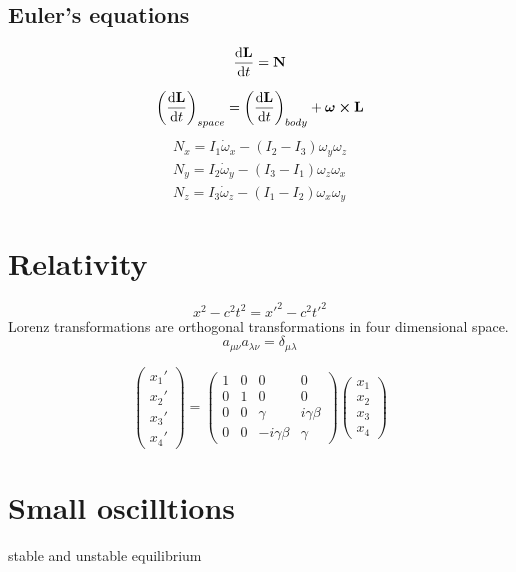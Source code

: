\documentclass[12pt]{article}
\begin{document}
\subsection*{Euler's equations}
\[\dv{\vb{L}}{t}=\vb{N}\]

\[\qty(\dv{\vb{L}}{t})_{space}=\qty(\dv{\vb{L}}{t})_{body}+\bm{\omega}\cp\vb{L}\]
\begin{align*}
N_x=I_1\dot{\omega}_x-(I_2-I_3){\omega}_y{\omega}_z\\
N_y=I_2\dot{\omega}_y-(I_3-I_1){\omega}_z{\omega}_x\\
N_z=I_3\dot{\omega}_z-(I_1-I_2){\omega}_x{\omega}_y
\end{align*}
\section*{Relativity}

\[x^2-c^2t^2=x'^2-c^2t'^2\]
Lorenz transformations are orthogonal transformations in four dimensional space.
\[a_{\mu\nu}a_{\lambda\nu}=\delta_{\mu\lambda}\]

\[
\begin{pmatrix}
x_1'\\ x_2'\\ x_3'\\ x_4'
\end{pmatrix}
=
\begin{pmatrix}
1& 0& 0& 0\\ 0& 1& 0& 0\\ 0& 0& \gamma& i\gamma\beta\\ 0& 0& -i\gamma\beta& \gamma
\end{pmatrix}
\begin{pmatrix}
x_1\\ x_2\\ x_3\\ x_4
\end{pmatrix}
\]

\section*{Small oscilltions}
stable and unstable equilibrium
\end{document}
